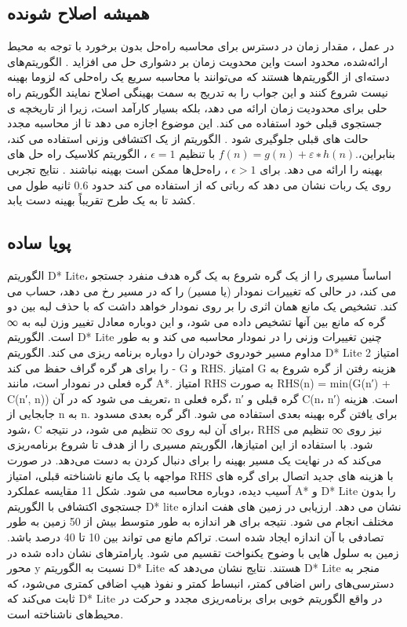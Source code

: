\subsection{همیشه اصلاح شونده}
در  عمل ، مقدار زمان در دسترس برای محاسبه راه‌حل بدون برخورد با توجه به محیط ارائه‌شده، محدود است واین محدویت زمان بر دشواری  حل می افزاید . الگوریتم‌های  دسته‌ای از الگوریتم‌ها هستند که می‌توانند با محاسبه سریع یک راه‌حلی که لزوما بهینه نیست  شروع کنند و این جواب را به تدریج به سمت بهینگی اصلاح نمایند  الگوریتم  راه حلی برای محدودیت زمان  ارائه می دهد، بلکه بسیار کارآمد است، زیرا از تاریخچه ی جستجوی قبلی خود استفاده می کند. این موضوع  اجازه می دهد تا از محاسبه مجدد حالت های قبلی جلوگیری شود . الگوریتم از یک اکتشافی وزنی استفاده می کند، بنابراین،$ f(n) = g(n) + ε∗ h(n).$ با تنظیم 
$\epsilon=1$  
، الگوریتم کلاسیک  راه حل های بهینه را ارائه می دهد. برای
 $\epsilon>1$ 
، راه‌حل‌ها ممکن است بهینه نباشند . نتایج تجربی روی یک ربات نشان می دهد که رباتی که از 
استفاده می کند حدود 0.6 ثانیه طول می کشد تا به یک طرح تقریباً بهینه دست یابد. 



\subsection{پویا ساده}

الگوریتم D* Lite، اساساً مسیری را از یک گره شروع به یک گره هدف منفرد جستجو می کند، در حالی که تغییرات نمودار (یا مسیر) را که در مسیر رخ می دهد، حساب می کند. تشخیص یک مانع همان اثری را بر روی نمودار خواهد داشت که با حذف لبه بین دو گره که مانع بین آنها تشخیص داده می شود، و این دوباره معادل تغییر وزن لبه به ∞ است. الگوریتم D* Lite چنین تغییرات وزنی را در نمودار محاسبه می کند و به طور مداوم مسیر خودروی خودران را دوباره برنامه ریزی می کند. الگوریتم D* Lite 2 امتیاز را برای هر گره گراف حفظ می کند - G و RHS. امتیاز G هزینه رفتن از گره شروع به گره فعلی در نمودار است، مانند A*. امتیاز RHS به صورت RHS(n) = min(G(n′) + C(n′, n)) تعریف می شود که در آن، n گره فعلی، n′ گره قبلی و C(n، n′) است. هزینه جابجایی از n به n. برای یافتن گره بهینه بعدی استفاده می شود. اگر گره بعدی مسدود شود، C برای آن لبه روی ∞ تنظیم می شود، در نتیجه، RHS نیز روی ∞ تنظیم می شود. با استفاده از این امتیازها، الگوریتم مسیری را از هدف تا شروع برنامه‌ریزی می‌کند که در نهایت یک مسیر بهینه را برای دنبال کردن به دست می‌دهد. در صورت مواجهه با یک مانع ناشناخته قبلی، امتیاز RHS با هزینه های جدید اتصال برای گره های آسیب دیده، دوباره محاسبه می شود. شکل 11 مقایسه عملکرد A* و D* Lite را بدون جستجوی اکتشافی با الگوریتم D* lite نشان می دهد. ارزیابی در زمین های هفت اندازه مختلف انجام می شود. نتیجه برای هر اندازه به طور متوسط بیش از 50 زمین به طور تصادفی با آن اندازه ایجاد شده است. تراکم مانع می تواند بین 10 تا 40 درصد باشد. زمین به سلول هایی با وضوح یکنواخت تقسیم می شود. پارامترهای نشان داده شده در محور y نسبت به الگوریتم D* Lite هستند. نتایج نشان می‌دهد که D* Lite منجر به دسترسی‌های راس اضافی کمتر، انبساط کمتر و نفوذ هیپ اضافی کمتری می‌شود، که ثابت می‌کند که D* Lite در واقع الگوریتم خوبی برای برنامه‌ریزی مجدد و حرکت در محیط‌های ناشناخته است.





